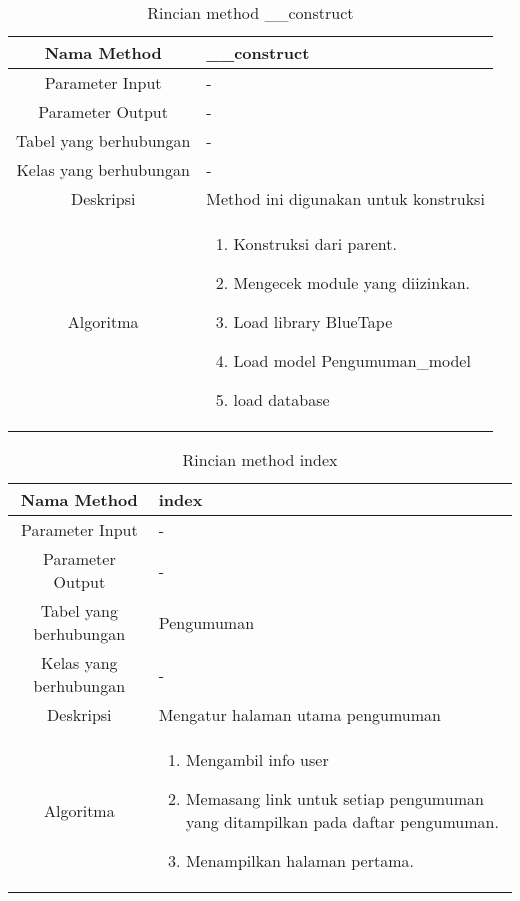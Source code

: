 \begin{center}
	\begin{table}[H]
	\caption{Rincian method \_\_construct}
	\label{table:pengumuman-construct}
\begin{tabular}{|c|p{11cm}|}
\hline
Nama Method 	& 	 	\_\_construct \\
\hline
Parameter Input & - \\
\hline
Parameter Output & - \\
\hline
Tabel yang berhubungan & -\\
\hline
Kelas yang berhubungan &  - \\
\hline
Deskripsi	& Method ini digunakan untuk konstruksi\\
\hline
Algoritma	& \begin{enumerate}
				\item Konstruksi dari parent.
				\item Mengecek module yang diizinkan.
				\item Load library BlueTape
				\item Load model Pengumuman\_model
				\item load database
				\end{enumerate} \\
\hline
\end{tabular}
\end{table}
\end{center}

\begin{center}
	\begin{table}[H]
	\caption{Rincian method index}
	\label{table:pengumuman-index}
\begin{tabular}{|c|p{11cm}|}
\hline
Nama Method 	& 	 index	\\
\hline
Parameter Input & - \\
\hline
Parameter Output & - \\
\hline
Tabel yang berhubungan & Pengumuman \\
\hline
Kelas yang berhubungan & - \\
\hline
Deskripsi	& Mengatur halaman utama pengumuman\\
\hline
Algoritma	& \begin{enumerate}
				\item Mengambil info user
				\item Memasang link untuk setiap pengumuman yang ditampilkan pada daftar pengumuman.
				\item Menampilkan halaman pertama.
				\end{enumerate} \\
\hline
\end{tabular}
\end{table}
\end{center}

